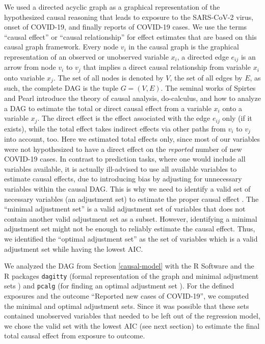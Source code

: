 \documentclass[]{elsarticle} %
\begin{document}
We used a directed acyclic graph as a graphical representation of the hypothesized causal reasoning that leads to exposure to the SARS-CoV-2 virus, onset of COVID-19, and finally reports of COVID-19 cases. We use the terms ``causal effect'' or ``causal relationship'' for effect estimates that are based on this causal graph framework. Every node \(v_i\) in the causal graph is the graphical representation of an observed or unobserved variable \(x_i\), a directed edge \(e_{ij}\) is an arrow from node \(v_i\) to \(v_j\) that implies a direct causal relationship from variable \(x_i\) onto variable \(x_j\). The set of all nodes is denoted by \(V\), the set of all edges by \(E\), as such, the complete DAG is the tuple \(G=(V,E)\). The seminal works of Spirtes and Pearl \citep{spirtes2000causation, pearl2009causality} introduce the theory of causal analysis, do-calculus, and how to analyze a DAG to estimate the total or direct causal effect from a variable \(x_i\) onto a variable \(x_j\). The direct effect is the effect associated with the edge \(e_{ij}\) only (if it exists), while the total effect takes indirect effects via other paths from \(v_i\) to \(v_j\) into account, too. Here we estimated total effects only, since most of our variables were not hypothesized to have a direct effect on the \emph{reported} number of new COVID-19 cases. In contrast to prediction tasks, where one would include all variables available, it is actually ill-advised to use all available variables to estimate causal effects, due to introducing bias by adjusting for unnecessary variables within the causal DAG. This is why we need to identify a valid set of necessary variables (an adjustment set) to estimate the proper causal effect \citep{pearl2009causality}. The ``minimal adjustment set'' \citep{greenland1999causal} is a valid adjustment set of variables that does not contain another valid adjustment set as a subset. However, identifying a minimal adjustment set might not be enough to reliably estimate the causal effect. Thus, we identified the ``optimal adjustment set'' \citep{henckel2019graphical} as the set of variables which is a valid adjustment set while having the lowest AIC.

We analyzed the DAG from Section \ref{causal-model} with the R Software \citep{rsoftware} and the R packages \texttt{dagitty} (formal representation of the graph and minimal adjustment sets \citep{textor_robust_2017}) and \texttt{pcalg} (for finding an optimal adjustment set \citep{pcalg}). For the defined exposures and the outcome ``Reported new cases of COVID-19'', we computed the minimal and optimal adjustment sets. Since it was possible that these sets contained unobserved variables that needed to be left out of the regression model, we chose the valid set with the lowest AIC (see next section) to estimate the final total causal effect from exposure to outcome.
\end{document}
